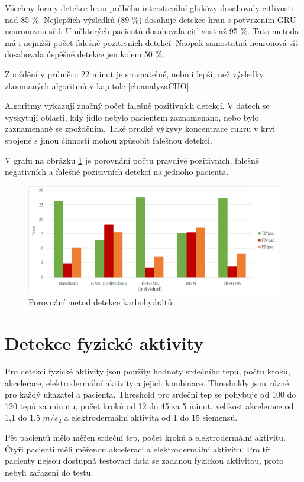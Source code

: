 Všechny formy detekce hran průběhu intersticiální glukózy dosahovaly citlivosti nad 85 \%. Nejlepších výsledků (89 \%) dosahuje detekce hran s potvrzením GRU neuronovou sítí. U některých pacientů dosahovala citlivost až 95 \%. Tato metoda má i nejnižší počet falešně pozitivních detekcí. Naopak samostatná neuronová síť dosahovala úspěšné detekce jen kolem 50 \%.

Zpoždění v průměru 22 minut je srovnatelné, nebo i lepší, než výsledky zkoumaných algoritmů v kapitole \ref{ch:analyzaCHO}.

Algoritmy vykazují značný počet falešně pozitivních detekcí. V datech se vyskytují oblasti, kdy jídlo nebylo pacientem zaznamenáno, nebo bylo zaznamenané se zpožděním. Také prudké výkyvy koncentrace cukru v krvi spojené s jinou činností mohou způsobit falešnou detekci.

V grafu na obrázku \ref{fig:res_cho} je porovnání počtu pravdivě pozitivních, falešně negativních a falešně pozitivních detekcí  na jednoho pacienta.

\begin{figure}[H]
\caption{Porovnání metod detekce karbohydrátů}
\label{fig:res_cho}
\includegraphics[width=1\textwidth]{img/vysledky/cho/tp.png}
\end{figure}


\section{Detekce fyzické aktivity}

Pro detekci fyzické aktivity jsou použity hodnoty srdečního tepu, počtu kroků, akcelerace, elektrodermální aktivity a jejich kombinace. Thresholdy jsou různé pro každý ukazatel a pacienta. Threshold pro srdeční tep se pohybuje od 100 do 120 tepů za minutu, počet kroků od 12 do 45 za 5 minut, velikost akcelerace od 1,1 do 1,5 $m/s_{2}$ a elektrodermální aktivita od 1 do 15 siemensů.

Pět pacientů mělo měřen srdeční tep, počet kroků a elektrodermální aktivitu. Čtyři pacienti měli měřenou akceleraci a elektrodermální aktivitu. Pro tři pacienty nejsou dostupná testovací data se zadanou fyzickou aktivitou, proto nebyli zařazeni do testů.


